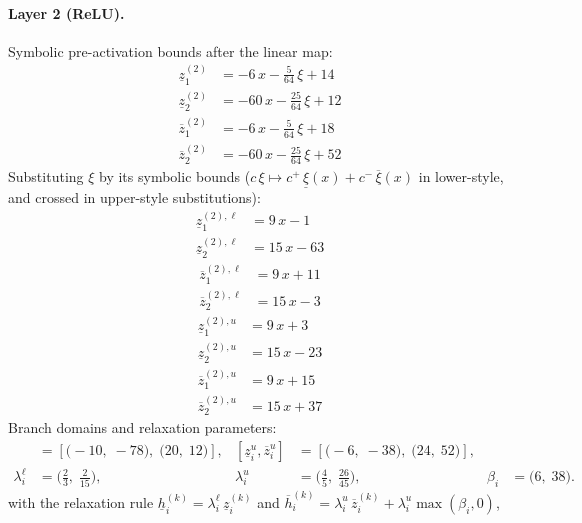\documentclass[11pt]{article}
\begin{document}
\paragraph{Layer 2 (ReLU).}
Symbolic pre-activation bounds after the linear map:
\begin{align*}
\underline{z}^{(2)}_{1} &= -6\,x - \frac{5}{64}\,\xi + 14 \\
\underline{z}^{(2)}_{2} &= -60\,x - \frac{25}{64}\,\xi + 12
\end{align*}
\begin{align*}
\overline{z}^{(2)}_{1} &= -6\,x - \frac{5}{64}\,\xi + 18 \\
\overline{z}^{(2)}_{2} &= -60\,x - \frac{25}{64}\,\xi + 52
\end{align*}
Substituting $\xi$ by its symbolic bounds ($c\,\xi \mapsto c^{+}\,\underline{\xi}(x) + c^{-}\,\overline{\xi}(x)$ in lower-style, and crossed in upper-style substitutions):
\begin{align*}
\underline{z}^{(2),\ell}_{1} &= 9\,x - 1 \\
\underline{z}^{(2),\ell}_{2} &= 15\,x - 63
\end{align*}
\begin{align*}
\overline{z}^{(2),\ell}_{1} &= 9\,x + 11 \\
\overline{z}^{(2),\ell}_{2} &= 15\,x - 3
\end{align*}
\begin{align*}
\underline{z}^{(2),u}_{1} &= 9\,x + 3 \\
\underline{z}^{(2),u}_{2} &= 15\,x - 23
\end{align*}
\begin{align*}
\overline{z}^{(2),u}_{1} &= 9\,x + 15 \\
\overline{z}^{(2),u}_{2} &= 15\,x + 37
\end{align*}
Branch domains and relaxation parameters:
\begin{align*}
[\underline{z}^{\ell}_i, \overline{z}^{\ell}_i] &= [\bigl(-10,\; -78\bigr),\; \bigl(20,\; 12\bigr)], & [\underline{z}^{u}_i, \overline{z}^{u}_i] &= [\bigl(-6,\; -38\bigr),\; \bigl(24,\; 52\bigr)], \\
\lambda^{\ell}_i &= \bigl(\frac{2}{3},\; \frac{2}{15}\bigr), & \lambda^{u}_i &= \bigl(\frac{4}{5},\; \frac{26}{45}\bigr), & \beta_i &= \bigl(6,\; 38\bigr).
\end{align*}
with the relaxation rule
$\underline{h}^{(k)}_i = \lambda^{\ell}_i\, \underline{z}^{(k)}_i$ and
$\overline{h}^{(k)}_i = \lambda^{u}_i\, \overline{z}^{(k)}_i + \lambda^{u}_i \max(\beta_i, 0)$,
\end{document}
